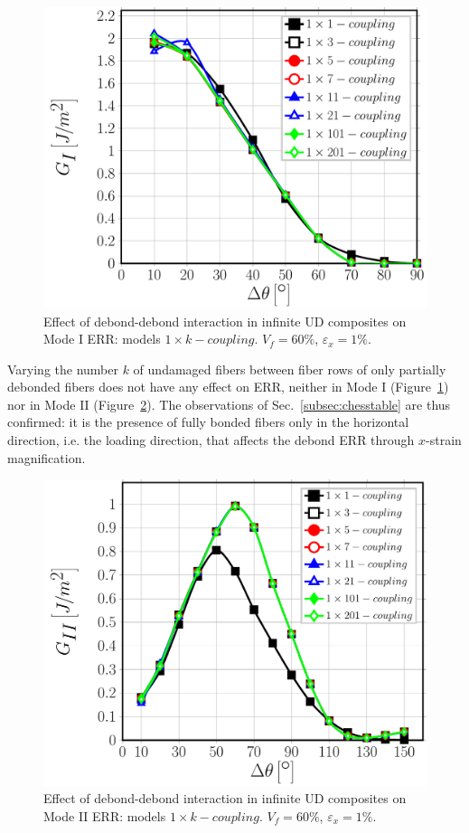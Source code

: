 \documentclass[review]{elsarticle}
\begin{document}
\begin{figure}[!h]
\centering
\includegraphics[width=\textwidth]{1xk-coupling-vf60-GI.pdf}
\caption{Effect of debond-debond interaction in infinite UD composites on Mode I ERR: models $1\times k-coupling$. $V_{f}=60\%$, $\varepsilon_{x}=1\%$.}\label{fig:horizontalGI}
\end{figure}

Varying the number $k$ of undamaged fibers between fiber rows of only partially debonded fibers does not have any effect on ERR, neither in Mode I (Figure~\ref{fig:horizontalGI}) nor in Mode II (Figure~\ref{fig:horizontalGII}). The observations of Sec.~\ref{subsec:chesstable} are thus confirmed: it is the presence of fully bonded fibers only in the horizontal direction, i.e. the loading direction, that affects the debond ERR through $x$-strain magnification.

\begin{figure}[!h]
\centering
\includegraphics[width=\textwidth]{1xk-coupling-vf60-GII.pdf}
\caption{Effect of debond-debond interaction in infinite UD composites on Mode II ERR: models $1\times k-coupling$. $V_{f}=60\%$, $\varepsilon_{x}=1\%$.}\label{fig:horizontalGII}
\end{figure}
\end{document}
